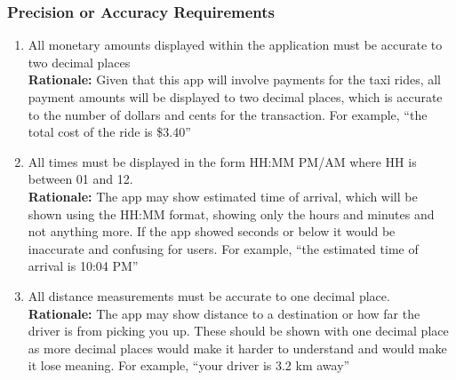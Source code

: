 \documentclass[]{article}
\begin{document}
\subsubsection{Precision or Accuracy Requirements}
\label{ssub:precision_or_accuracy_requirements}
\begin{enumerate}[{PR-PA}1. ]
	\item All monetary amounts displayed within the application must be accurate to two decimal places \\
	{\bf Rationale:} Given that this app will involve payments for the taxi rides, all payment amounts will be displayed to two decimal places, which is accurate to the number of dollars and cents for the transaction. For example, ``the total cost of the ride is \$3.40'' \\
	\item All times must be displayed in the form HH:MM PM/AM where HH is between 01 and 12. \\
	{\bf Rationale:} The app may show estimated time of arrival, which will be shown using the HH:MM format, showing only the hours and minutes and not anything more. If the app showed seconds or below it would be inaccurate and confusing for users. For example, ``the estimated time of arrival is 10:04 PM'' \\
	\item All distance measurements must be accurate to one decimal place. \\
	{\bf Rationale:} The app may show distance to a destination or how far the driver is from picking you up. These should be shown with one decimal place as more decimal places would make it harder to understand and would make it lose meaning. For example, ``your driver is 3.2 km away''
\end{enumerate}
\end{document}
